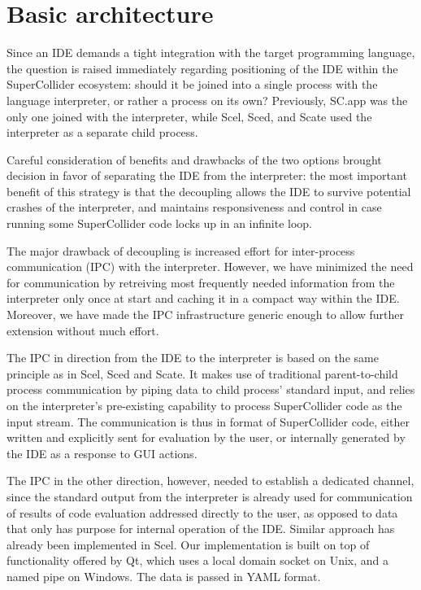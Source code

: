 \documentclass[11pt,a4paper]{article}
\begin{document}
\section{Basic architecture}

Since an IDE demands a tight integration with the target programming language, the question is
raised immediately regarding positioning of the IDE within the SuperCollider ecosystem: should it be
joined into a single process with the language interpreter, or rather a process on its own?
Previously, SC.app was the only one joined with the interpreter, while Scel, Sced, and Scate used
the interpreter as a separate child process.

Careful consideration of benefits and drawbacks of the two options brought decision in favor of
separating the IDE from the interpreter: the most important benefit of this strategy is that the
decoupling allows the IDE to survive potential crashes of the interpreter, and maintains
responsiveness and control in case running some SuperCollider code locks up in an infinite loop.

The major drawback of decoupling is increased effort for inter-process communication (IPC) with the
interpreter. However, we have minimized the need for communication by retreiving most frequently
needed information from the interpreter only once at start and caching it in a compact way within
the IDE. Moreover, we have made the IPC infrastructure generic enough to allow further extension
without much effort.

The IPC in direction from the IDE to the interpreter is based on the same principle as in Scel,
Sced and Scate. It makes use of traditional parent-to-child process communication by piping data to
child process' standard input, and relies on the interpreter's pre-existing capability to
process SuperCollider code as the input stream. The communication is thus in format of SuperCollider
code, either written and explicitly sent for evaluation by the user, or internally generated by
the IDE as a response to GUI actions.

The IPC in the other direction, however, needed to establish a dedicated channel, since the standard
output from the interpreter is already used for communication of results of code evaluation
addressed directly to the user, as opposed to data that only has purpose for internal operation of
the IDE. Similar approach has already been implemented in Scel. Our implementation is built on top
of functionality offered by Qt, which uses a local domain socket on Unix, and a named pipe on
Windows. The data is passed in YAML format.
\end{document}
